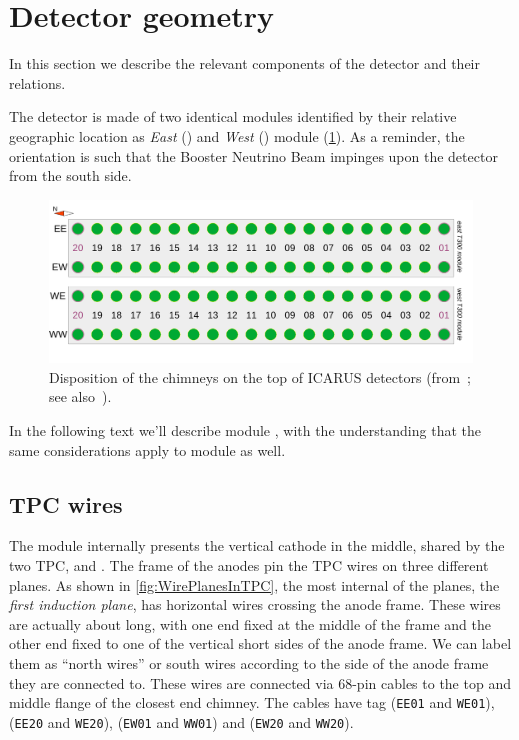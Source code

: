 \section{Detector geometry}
\label{sec:geometry}

In this section we describe the relevant components of the detector and their relations.

The detector is made of two identical modules
identified by their relative geographic location
as \emph{East} () and \emph{West} () module (\cref{fig:chimneys}).
As a reminder, the orientation is such that the Booster Neutrino Beam impinges
upon the detector from the south side.

\begin{figure}[bt] %
  \includegraphics[width=\textwidth]{figures/ChimneyMap}
  \caption{
    Disposition of the chimneys on the top of ICARUS detectors (from~\cite{SBNDocDB14316}; see also~\cite{SBNDocDBxxxx:ConnTest}).
    \label{fig:chimneys}
  }
\end{figure}

In the following text we'll describe module ,
with the understanding that the same considerations apply to module  as well.


\subsection{TPC wires}
\label{ssec:geometry:wires}

The module internally presents the vertical cathode in the middle, shared by
the two TPC,  and .
The frame of the anodes pin the TPC wires on three different planes.
As shown in \cref{fig:WirePlanesInTPC}, the most internal of the planes,
the \emph{first induction plane}, has horizontal wires crossing the anode frame.
These wires are actually about  long, with one end fixed at the middle
of the frame and the other end fixed to one of the vertical short sides of the anode frame.
We can label them as ``north wires'' or south wires
according to the side of the anode frame they are connected to.
These wires are connected via 68-pin cables to the top and middle flange
of the closest end chimney.
The cables have tag
 (\texttt{EE01} and \texttt{WE01}),
 (\texttt{EE20} and \texttt{WE20}),
 (\texttt{EW01} and \texttt{WW01})
and
 (\texttt{EW20} and \texttt{WW20}).

